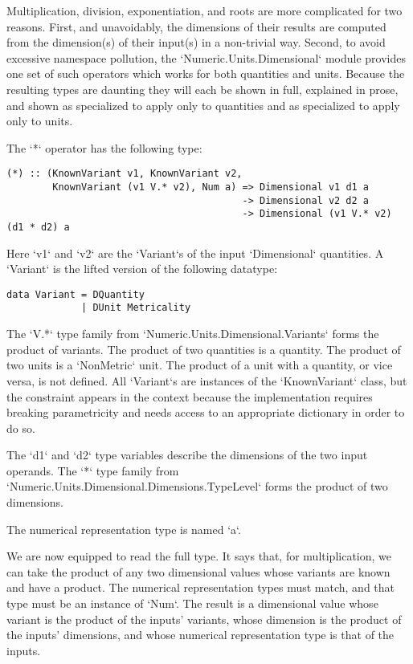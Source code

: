 \documentclass[11pt]{report}
\begin{document}
Multiplication, division, exponentiation, and roots are more complicated for two reasons. First, and unavoidably, the dimensions of their results are computed
from the dimension(s) of their input(s) in a non-trivial way. Second, to avoid excessive namespace pollution, the `Numeric.Units.Dimensional` module provides
one set of such operators which works for both quantities and units. Because the resulting types are daunting they will each be shown in full, explained in prose,
and shown as specialized to apply only to quantities and as specialized to apply only to units.

The `*` operator has the following type:

\begin{lstlisting}
(*) :: (KnownVariant v1, KnownVariant v2,
        KnownVariant (v1 V.* v2), Num a) => Dimensional v1 d1 a
                                         -> Dimensional v2 d2 a
                                         -> Dimensional (v1 V.* v2) (d1 * d2) a
\end{lstlisting}

Here `v1` and `v2` are the `Variant`s of the input `Dimensional` quantities. A `Variant` is the lifted version of the
following datatype:

\begin{lstlisting}
data Variant = DQuantity
             | DUnit Metricality
\end{lstlisting}

The `V.*` type family from `Numeric.Units.Dimensional.Variants` forms the product of variants. The product of two quantities is a quantity.
The product of two units is a `NonMetric` unit. The product of a unit with a quantity, or vice versa, is not defined. All `Variant`s are
instances of the `KnownVariant` class, but the constraint appears in the context because the implementation requires breaking parametricity and
needs access to an appropriate dictionary in order to do so.

The `d1` and `d2` type variables describe the dimensions of the two input operands. The `*` type family from `Numeric.Units.Dimensional.Dimensions.TypeLevel`
forms the product of two dimensions.

The numerical representation type is named `a`.

We are now equipped to read the full type. It says that, for multiplication, we can take the product of any two dimensional values whose
variants are known and have a product. The numerical representation types must match, and that type must be an instance of `Num`. The result is a dimensional value
whose variant is the product of the inputs' variants, whose dimension is the product of the inputs' dimensions, and whose numerical representation
type is that of the inputs.
\end{document}
